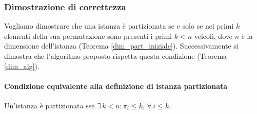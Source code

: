 \documentclass[../../../relazione.tex]{subfiles}
\begin{document}


\subsubsection{Dimostrazione di correttezza}
Vogliamo dimostrare che una istanza è partizionata se e solo se nei primi $k$ elementi della sua permutazione sono presenti i primi $k < n$ veicoli, dove $n$ è la dimensione dell'istanza (Teorema \ref{dim_part_iniziale}).
Successivamente si dimostra che l'algoritmo proposto rispetta questa condizione (Teorema \ref{dim_alg}).

\paragraph{Condizione equivalente alla definizione di istanza partizionata}
\begin{theorem}
    \label{dim_part_iniziale}
    Un'istanza è partizionata sse $\exists\, k < n : \pi_i \leq k,\, \forall\, i \leq k$.
\end{theorem}
\end{document}
